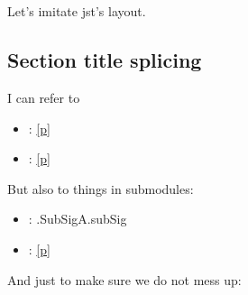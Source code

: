 {\begin{ocamlindent}
\label{container-page-test-module-Ocamlary-module-Aliases-type-p1}\\
\label{container-page-test-module-Ocamlary-module-Aliases-type-p2}\\
\end{ocamlindent}%
\begin{ocamlindent}Let's imitate jst's layout.\end{ocamlindent}%
\medbreak
\subsection{Section title splicing\label{section-title-splicing}}%
I can refer to

\begin{itemize}\item{ : \hyperref[container-page-test-module-Ocamlary-indexmodules]{[p\pageref*{container-page-test-module-Ocamlary-indexmodules}]}}%
\item{ : \hyperref[container-page-test-module-Ocamlary-aliases]{[p\pageref*{container-page-test-module-Ocamlary-aliases}]}}\end{itemize}%
But also to things in submodules:

\begin{itemize}\item{ : .SubSigA.subSig}%
\item{ : \hyperref[container-page-test-module-Ocamlary-module-Aliases-incl]{[p\pageref*{container-page-test-module-Ocamlary-module-Aliases-incl}]}}\end{itemize}%
And just to make sure we do not mess up:

}

